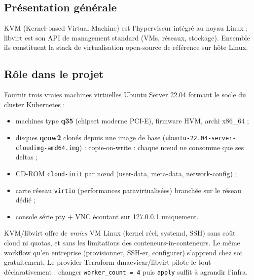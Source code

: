 \documentclass[12pt,a4paper,twoside,openright]{report}
\begin{document}
\subsection{Présentation générale}
KVM (Kernel-based Virtual Machine) est l'hyperviseur intégré au noyau Linux ; libvirt est son API de management standard (VMs, réseaux, stockage). Ensemble ils constituent la stack de virtualisation open-source de référence sur hôte Linux.

\subsection{Rôle dans le projet}
Fournir trois vraies machines virtuelles Ubuntu Server 22.04 formant le socle du cluster Kubernetes :
\begin{itemize}[itemsep=1pt]
  \item machines type \textbf{q35} (chipset moderne PCI-E), firmware HVM, archi x86\_64 ;
  \item disques \textbf{qcow2} clonés depuis une image de base (\texttt{ubuntu-22.04-server-} \texttt{cloudimg-amd64.img}) : copie-on-write : chaque nœud ne consomme que ses deltas ;
  \item CD-ROM \texttt{cloud-init} par nœud (user-data, meta-data, network-config) ;
  \item carte réseau \texttt{virtio} (performances paravirtualisées) branchée sur le réseau dédié ;
  \item console série pty + VNC écoutant sur 127.0.0.1 uniquement.
\end{itemize}

\begin{whybox}
KVM/libvirt offre de \emph{vraies} VM Linux (kernel réel, systemd, SSH) sans coût cloud ni quotas, et sans les limitations des conteneurs-in-conteneurs. Le même workflow qu'en entreprise (provisionner, SSH-er, configurer) s'apprend chez soi gratuitement. Le provider Terraform dmacvicar/libvirt pilote le tout déclarativement : changer \texttt{worker\_count = 4} puis \texttt{apply} suffit à agrandir l'infra.
\end{whybox}
\end{document}
